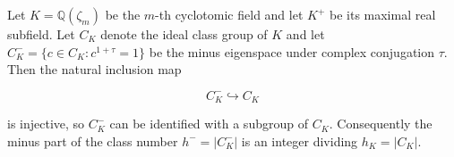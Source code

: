Let $K = \mathbb{Q}(\zeta_m)$ be the $m$-th cyclotomic field and let $K^+$ be its maximal real subfield. Let $C_K$ denote the ideal class group of $K$ and let $C_K^- = \{c \in C_K : c^{1+\tau} = 1\}$ be the minus eigenspace under complex conjugation $\tau$. Then the natural inclusion map

$$
C_K^- \hookrightarrow C_K
$$

is injective, so $C_K^-$ can be identified with a subgroup of $C_K$. Consequently the minus part of the class number $h^- = |C_K^-|$ is an integer dividing $h_K = |C_K|$.
